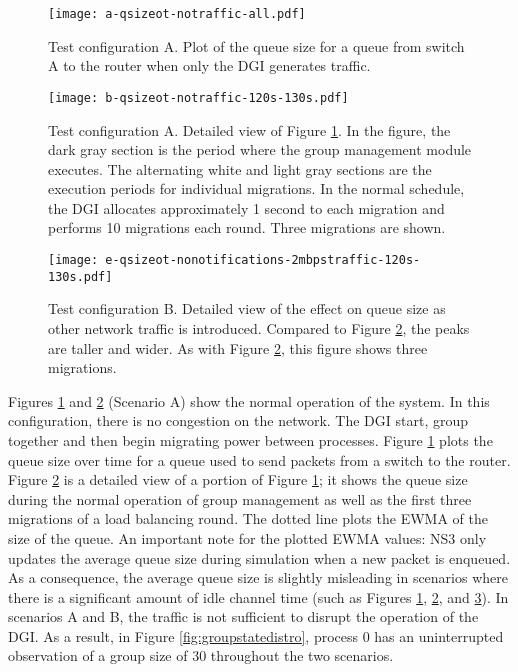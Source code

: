 \begin{figure}
\centering
\texttt{[image: a-qsizeot-notraffic-all.pdf]}
\caption[Plot of the queue size for a queue from switch A to the router when only the DGI generates traffic.]{Test configuration A. Plot of the queue size for a queue from switch A to the router when only the DGI generates traffic.}
\label{fig:plota}
\end{figure}

\begin{figure}
\centering
\texttt{[image: b-qsizeot-notraffic-120s-130s.pdf]}
\caption[Detailed view of Figure \ref{fig:plota}.]{
    Test configuration A.
Detailed view of Figure \ref{fig:plota}. In the figure, the dark gray section is the period where the group management module executes.
The alternating white and light gray sections are the execution periods for individual migrations.
In the normal schedule, the DGI allocates approximately 1 second to each migration and performs 10 migrations each round.
Three migrations are shown.}
\label{fig:plotb}
\end{figure}

\begin{figure}
\centering
\texttt{[image: e-qsizeot-nonotifications-2mbpstraffic-120s-130s.pdf]}
\caption[Detailed view of the effect on queue size as other network traffic is introduced.]{
    Test configuration B.
Detailed view of the effect on queue size as other network traffic is introduced.
Compared to Figure \ref{fig:plotb}, the peaks are taller and wider. 
As with Figure \ref{fig:plotb}, this figure shows three migrations.}
\label{fig:plote}
\end{figure}

Figures \ref{fig:plota} and \ref{fig:plotb} (Scenario A) show the normal operation of the system.
In this configuration, there is no congestion on the network. 
The \ac{DGI} start, group together and then begin migrating power between processes.
Figure \ref{fig:plota} plots the queue size over time for a queue used to send packets from a switch to the router.
Figure \ref{fig:plotb} is a detailed view of a portion of Figure \ref{fig:plota};
it shows the queue size during the normal operation of group management as well as the first three migrations of a load balancing round.
The dotted line plots the \ac{EWMA} of the size of the queue.
An important note for the plotted \ac{EWMA} values: \ac{NS3} only updates the average queue size during simulation when a new packet is enqueued.
As a consequence, the average queue size is slightly misleading in scenarios where there is a significant amount of idle channel time (such as Figures \ref{fig:plota}, \ref{fig:plotb}, and \ref{fig:plote}).
In scenarios A and B, the traffic is not sufficient to disrupt the operation of the DGI.
As a result, in Figure \ref{fig:groupstatedistro}, process 0 has an uninterrupted observation of a group size of 30 throughout the two scenarios.




